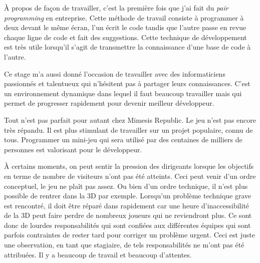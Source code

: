 À propos de façon de travailler, c'est la première fois que j'ai fait du
\textit{pair programming} en entreprise.
Cette méthode de travail consiste à programmer à deux devant le même écran,
l'un écrit le code tandis que l'autre passe en revue chaque ligne de code et
fait des suggestions. Cette technique de développement est très utile lorsqu'il
s'agit de transmettre la connaissance d'une base de code à l'autre.

Ce stage m'a aussi donné l'occasion de travailler avec des informaticiens
passionnés et talentueux qui n'hésitent pas à partager leurs connaissances.
C'est un environnement dynamique dans lequel il faut beaucoup travailler mais
qui permet de progresser rapidement pour devenir meilleur développeur.

Tout n'est pas parfait pour autant chez Mimesis Republic.
Le jeu n'est pas encore très répandu. Il est plus stimulant de travailler
sur un projet populaire, connu de tous. Programmer un mini-jeu qui sera
 utilisé par des centaines de milliers de personnes est valorisant pour le
 développeur.

À certains moments, on peut sentir la pression des dirigeants lorsque les
objectifs en terme de nombre de visiteurs n'ont pas été atteints.
Ceci peut venir d'un ordre conceptuel, le jeu ne plaît pas assez.
Ou bien d'un ordre technique, il n'est plus possible de rentrer dans la 3D par
exemple.
Lorsqu'un problème technique grave est rencontré, il doit être réparé dans
rapidement car une heure d'inaccessibilité de la 3D peut faire perdre de
nombreux joueurs qui ne reviendront plus.
Ce sont donc de lourdes responsabilités qui sont confiées aux différentes
équipes qui sont parfois contraintes de rester tard pour corriger un problème
urgent. Ceci est juste une observation, en tant que stagiaire, de tels
responsabilités ne m'ont pas été attribuées.
Il y a beaucoup de travail et beaucoup d'attentes.

